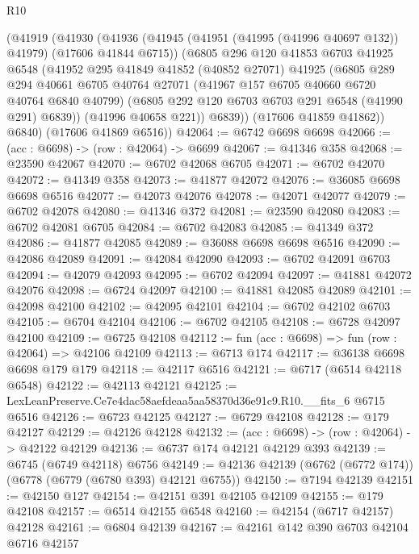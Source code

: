 \begin{lexlean}{R10}
\begin{coremodule}
      (@41919
        (@41930
          (@41936
            (@41945 (@41951 (@41995 (@41996 @40697 @132)) @41979) (@17606 @41844 @6715))
            (@6805
              @296
              @120
              @41853
              @6703
              @41925
              @6548
              (@41952
                @295
                @41849
                @41852
                (@40852 @27071)
                @41925
                (@6805
                  @289
                  @294
                  @40661
                  @6705
                  @40764
                  @27071
                  (@41967 @157 @6705 @40660 @6720 @40764 @6840 @40799)
                  (@6805 @292 @120 @6703 @6703 @291 @6548 (@41990 @291) @6839))
                (@41996 @40658 @221))
              @6839))
          (@17606 @41859 @41862))
        @6840)
      (@17606 @41869 @6516))
@42064 := @6742 @6698 @6698
@42066 := (acc : @6698) -> (row : @42064) -> @6699
@42067 := @41346 @358
@42068 := @23590 @42067
@42070 := @6702 @42068 @6705
@42071 := @6702 @42070
@42072 := @41349 @358
@42073 := @41877 @42072
@42076 := @36085 @6698 @6698 @6516
@42077 := @42073 @42076
@42078 := @42071 @42077
@42079 := @6702 @42078
@42080 := @41346 @372
@42081 := @23590 @42080
@42083 := @6702 @42081 @6705
@42084 := @6702 @42083
@42085 := @41349 @372
@42086 := @41877 @42085
@42089 := @36088 @6698 @6698 @6516
@42090 := @42086 @42089
@42091 := @42084 @42090
@42093 := @6702 @42091 @6703
@42094 := @42079 @42093
@42095 := @6702 @42094
@42097 := @41881 @42072 @42076
@42098 := @6724 @42097
@42100 := @41881 @42085 @42089
@42101 := @42098 @42100
@42102 := @42095 @42101
@42104 := @6702 @42102 @6703
@42105 := @6704 @42104
@42106 := @6702 @42105
@42108 := @6728 @42097 @42100
@42109 := @6725 @42108
@42112 := fun (acc : @6698) => fun (row : @42064) => @42106 @42109
@42113 := @6713 @174
@42117 := @36138 @6698 @6698 @179 @179
@42118 := @42117 @6516
@42121 := @6717 (@6514 @42118 @6548)
@42122 := @42113 @42121
@42125 := LexLeanPreserve.Ce7e4dac58aefdeaa5aa58370d36e91c9.R10.__fits_6 @6715 @6516
@42126 := @6723 @42125
@42127 := @6729 @42108
@42128 := @179 @42127
@42129 := @42126 @42128
@42132 := (acc : @6698) -> (row : @42064) -> @42122 @42129
@42136 := @6737 @174 @42121 @42129 @393
@42139 := @6745 (@6749 @42118) @6756
@42149 := @42136 @42139 (@6762 (@6772 @174)) (@6778 (@6779 (@6780 @393) @42121 @6755))
@42150 := @7194 @42139
@42151 := @42150 @127
@42154 := @42151 @391 @42105 @42109
@42155 := @179 @42108
@42157 := @6514 @42155 @6548
@42160 := @42154 (@6717 @42157) @42128
@42161 := @6804 @42139
@42167 := @42161 @142 @390 @6703 @42104 @6716 @42157

\end{coremodule}
\end{lexlean}
